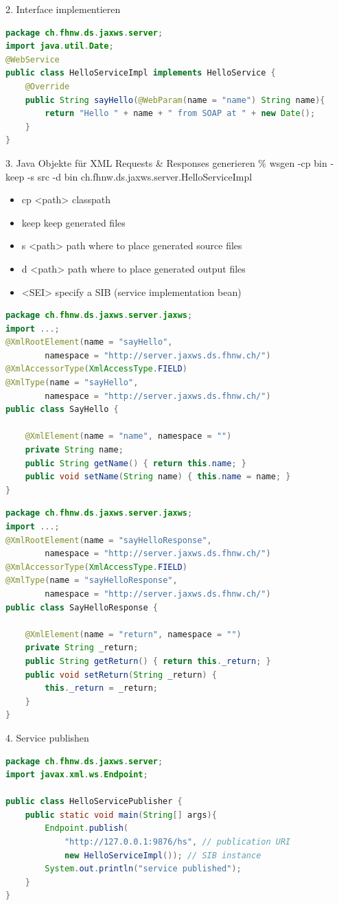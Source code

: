 \documentclass[10pt]{article}
\begin{document}
2. Interface implementieren
\begin{lstlisting}[language=Java, caption=Interface implementieren, style=JavaStyle]
package ch.fhnw.ds.jaxws.server; 
import java.util.Date; 
@WebService 
public class HelloServiceImpl implements HelloService { 
	@Override 
	public String sayHello(@WebParam(name = "name") String name){ 
		return "Hello " + name + " from SOAP at " + new Date(); 
	} 
}
\end{lstlisting}
3. Java Objekte für XML Requests \& Responses generieren
\% wsgen -cp bin -keep -s src -d bin ch.fhnw.ds.jaxws.server.HelloServiceImpl
\begin{itemize}
\item cp <path> classpath
\item keep keep generated files
\item s <path> path where to place generated source files
\item d <path> path where to place generated output files
\item <SEI> specify a SIB (service implementation bean)
\end{itemize}
\begin{lstlisting}[language=Java, caption=SayHello, style=JavaStyle]
package ch.fhnw.ds.jaxws.server.jaxws;
import ...;
@XmlRootElement(name = "sayHello", 
		namespace = "http://server.jaxws.ds.fhnw.ch/")
@XmlAccessorType(XmlAccessType.FIELD)
@XmlType(name = "sayHello",
		namespace = "http://server.jaxws.ds.fhnw.ch/")
public class SayHello {

	@XmlElement(name = "name", namespace = "")
	private String name;
	public String getName() { return this.name; }
	public void setName(String name) { this.name = name; }
}

\end{lstlisting}
\begin{lstlisting}[language=Java, caption=SayHelloResponse, style=JavaStyle]
package ch.fhnw.ds.jaxws.server.jaxws;
import ...;
@XmlRootElement(name = "sayHelloResponse",
		namespace = "http://server.jaxws.ds.fhnw.ch/")
@XmlAccessorType(XmlAccessType.FIELD)
@XmlType(name = "sayHelloResponse",
		namespace = "http://server.jaxws.ds.fhnw.ch/")
public class SayHelloResponse {

	@XmlElement(name = "return", namespace = "")
	private String _return;
	public String getReturn() { return this._return; }
	public void setReturn(String _return) {
		this._return = _return;
	}
}
\end{lstlisting}
4. Service publishen
\begin{lstlisting}[language=Java, caption=HelloServicePublisher, style=JavaStyle]
package ch.fhnw.ds.jaxws.server;
import javax.xml.ws.Endpoint;

public class HelloServicePublisher {
	public static void main(String[] args){
		Endpoint.publish(
			"http://127.0.0.1:9876/hs", // publication URI
			new HelloServiceImpl()); // SIB instance
		System.out.println("service published");
	}
}
\end{lstlisting}
\end{document}
